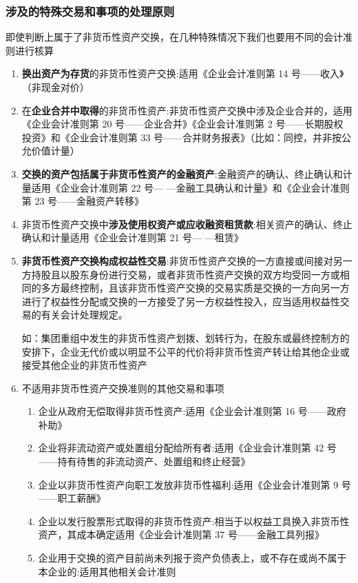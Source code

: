 \documentclass[UTF8,12pt]{ctexart}
\numberwithin{equation}{section} %
\numberwithin{figure}{section}
\numberwithin{table}{section}
\begin{document}
	\subsubsection{涉及的特殊交易和事项的处理原则}
	即使判断上属于了非货币性资产交换，在几种特殊情况下我们也要用不同的会计准则进行核算
	\begin{enumerate}
		\item \textbf{换出资产为存货}的非货币性资产交换:适用《企业会计准则第 14 号——收入》（非现金对价）
		
		\item 在\textbf{企业合并中取得}的非货币性资产:非货币性资产交换中涉及企业合并的，适用《企业会计准则第 20
		号——企业合并》《企业会计准则第 2 号——长期股权投资》和《企业会计准则第 33 号——合并财务报表》（比如：同控，并非按公允价值计量）
		
		\item \textbf{交换的资产包括属于非货币性资产的金融资产}:金融资产的确认、终止确认和计量适用《企业会计准则第 22 号—
		—金融工具确认和计量》和《企业会计准则第 23 号——金融资产转移》
		
		
		\item 非货币性资产交换中\textbf{涉及使用权资产或应收融资租赁款}:相关资产的确认、终止确认和计量适用《企业会计准则第 21 号—
		—租赁》
		
		
		\item \textbf{非货币性资产交换构成权益性交易}:非货币性资产交换的一方直接或间接对另一方持股且以股东身份进行交易，或者非货币性资产交换的双方均受同一方或相同的多方最终控制，且该非货币性资产交换的交易实质是交换的一方向另一方进行了权益性分配或交换的一方接受了另一方权益性投入，应当适用权益性交易的有关会计处理规定。
		
		如：集团重组中发生的非货币性资产划拨、划转行为，在股东或最终控制方的安排下，企业无代价或以明显不公平的代价将非货币性资产转让给其他企业或接受其他企业的非货币性资产
		
		\item 不适用非货币性资产交换准则的其他交易和事项
		\begin{enumerate}
			\item 企业从政府无偿取得非货币性资产:适用《企业会计准则第 16 号——政府补助》
			
			\item 企业将非流动资产或处置组分配给所有者:适用《企业会计准则第 42 号——持有待售的非流动资产、处置组和终止经营》
			
			\item 企业以非货币性资产向职工发放非货币性福利:适用《企业会计准则第 9 号——职工薪酬》
			
			\item 企业以发行股票形式取得的非货币性资产:相当于以权益工具换入非货币性资产，其成本确定适用《企业会计准则第 37 号——金融工具列报》
			
			\item 企业用于交换的资产目前尚未列报于资产负债表上，或不存在或尚不属于本企业的:适用其他相关会计准则
		\end{enumerate}
		
	\end{enumerate}
	
\end{document}
